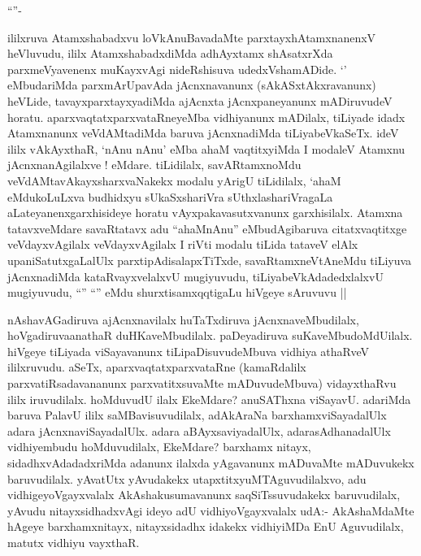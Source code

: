 \begin{artha}

``\stext''-

ililxruva Atamxshabadxvu loVkAnuBavadaMte parxtayxhAtamxnanenxV
heVluvudu, ililx AtamxshabadxdiMda adhAyxtamx shAsatxrXda
parxmeVyavenenx muKayxvAgi nideRshisuva udedxVshamADide. `\stext'
eMbudariMda parxmArUpavAda jAcnxnavanunx (sAkASxtAkxravanunx) heVLide,
tavayxparxtayxyadiMda ajAcnxta jAcnxpaneyanunx mADiruvudeV
horatu. aparxvaqtatxparxvataRneyeMba vidhiyanunx mADilalx, tiLiyade
idadx Atamxnanunx veVdAMtadiMda baruva jAcnxnadiMda
tiLiyabeVkaSeTx. ideV ililx vAkAyxthaR, `nAnu nAnu' eMba ahaM
vaqtitxyiMda I modaleV Atamxnu jAcnxnanAgilalxve ! eMdare. tiLidilalx,
savARtamxnoMdu veVdAMtavAkayxsharxvaNakekx modalu yArigU tiLidilalx,
`ahaM eMdukoLuLxva budhidxyu sUkaSxshariVra sUthxlashariVragaLa
aLateyanenxgarxhisideye horatu vAyxpakavasutxvanunx
garxhisilalx. Atamxna tatavxveMdare savaRtatavx adu ``ahaMnAnu''
eMbudAgibaruva citatxvaqtitxge veVdayxvAgilalx veVdayxvAgilalx I riVti
modalu tiLida tataveV elAlx upaniSatutxgaLalUlx
parxtipAdisalapxTiTxde, savaRtamxneVtAneMdu tiLiyuva jAcnxnadiMda
kataRvayxvelalxvU mugiyuvudu, tiLiyabeVkAdadedxlalxvU mugiyuvudu,
``\stext'' ``\stext'' eMdu shurxtisamxqqtigaLu hiVgeye sAruvuvu ||
\end{artha}

\begin{center}


\end{center}

\begin{artha}
nAshavAGadiruva ajAcnxnavilalx huTaTxdiruva jAcnxnaveMbudilalx,
hoVgadiruvaanathaR duHKaveMbudilalx. paDeyadiruva
suKaveMbudoMdUilalx. hiVgeye tiLiyada viSayavanunx tiLipaDisuvudeMbuva
vidhiya athaRveV ililxruvudu. aSeTx, aparxvaqtatxparxvataRne
(kamaRdalilx parxvatiRsadavananunx parxvatitxsuvaMte mADuvudeMbuva)
vidayxthaRvu ililx iruvudilalx. hoMduvudU ilalx EkeMdare? anuSAThxna
viSayavU. adariMda baruva PalavU ililx saMBavisuvudilalx, adAkAraNa
barxhamxviSayadalUlx adara jAcnxnaviSayadalUlx. adara
aBAyxsaviyadalUlx, adarasAdhanadalUlx vidhiyembudu hoMduvudilalx,
EkeMdare? barxhamx nitayx, sidadhxvAdadadxriMda adanunx ilalxda
yAgavanunx mADuvaMte mADuvukekx baruvudilalx. yAvatUtx yAvudakekx
utapxtitxyuMTAguvudilalxvo, adu vidhigeyoVgayxvalalx
AkAshakusumavanunx saqSiTssuvudakekx baruvudilalx, yAvudu
nitayxsidhadxvAgi ideyo adU vidhiyoVgayxvalalx udA:- AkAshaMdaMte
hAgeye barxhamxnitayx, nitayxsidadhx idakekx vidhiyiMDa EnU
Aguvudilalx, matutx vidhiyu vayxthaR. 
\end{artha}

